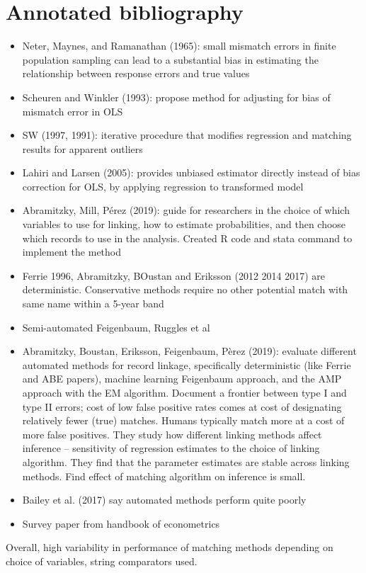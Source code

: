 \documentclass[12pt]{article}
\begin{document}
\section{Annotated bibliography}
\begin{itemize}
\item Neter, Maynes, and Ramanathan (1965): small mismatch errors in finite population sampling can lead to a substantial bias in estimating the relationship between response errors and true values
\item Scheuren and Winkler (1993): propose method for adjusting for bias of mismatch error in OLS
\item SW (1997, 1991): iterative procedure that modifies regression and matching results for apparent outliers 
\item Lahiri and Larsen (2005):   provides unbiased estimator directly instead of bias correction for OLS, by applying regression to transformed model 
\item Abramitzky, Mill, P\'erez (2019): guide for researchers in the choice of which variables to use for linking, how to estimate probabilities, and then choose which records to use in the analysis.  Created R code and stata command to implement the method
\item Ferrie 1996, Abramitzky, BOustan and Eriksson (2012 2014 2017) are deterministic.  Conservative methods require no other potential match with same name within a 5-year band
\item Semi-automated Feigenbaum, Ruggles et al 
\item Abramitzky, Boustan, Eriksson, Feigenbaum, P\`erez (2019): evaluate different automated methods for record linkage, specifically deterministic (like Ferrie and ABE papers), machine learning Feigenbaum approach, and the AMP approach with the EM algorithm.  Document a frontier between type I and type II errors; cost of low false positive rates comes at cost of designating relatively fewer (true) matches.  Humans typically match more at a cost of more false positives.  They study how different linking methods affect inference -- sensitivity of regression estimates to the choice of linking algorithm.  They find that the parameter estimates are stable across linking methods.  Find effect of matching algorithm on inference is small. 
\item Bailey et al. (2017) say automated methods perform quite poorly
\item Survey paper from handbook of econometrics
\end{itemize}

Overall, high variability in performance of matching methods depending on choice of variables, string comparators used. 
\end{document}
